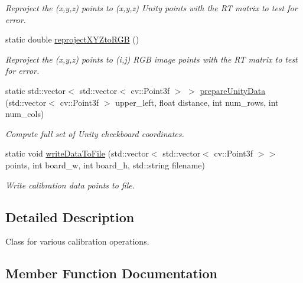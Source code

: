 \begin{DoxyCompactItemize}
\begin{DoxyCompactList}\small\item\em Reproject the (x,y,z) points to (x\textquotesingle{},y\textquotesingle{},z\textquotesingle{}) Unity points with the RT matrix to test for error. \end{DoxyCompactList}\item 
\hypertarget{class_calibration_a05a3ca33bf7fb56ddf0c683be667660a}{}\label{class_calibration_a05a3ca33bf7fb56ddf0c683be667660a} 
static double \hyperlink{class_calibration_a05a3ca33bf7fb56ddf0c683be667660a}{reproject\+X\+Y\+Zto\+R\+GB} ()
\begin{DoxyCompactList}\small\item\em Reproject the (x,y,z) points to (i,j) R\+GB image points with the RT matrix to test for error. \end{DoxyCompactList}\item 
\hypertarget{class_calibration_af202af5f65e2f7242d29f09760f668d9}{}\label{class_calibration_af202af5f65e2f7242d29f09760f668d9} 
static std\+::vector$<$ std\+::vector$<$ cv\+::\+Point3f $>$ $>$ \hyperlink{class_calibration_af202af5f65e2f7242d29f09760f668d9}{prepare\+Unity\+Data} (std\+::vector$<$ cv\+::\+Point3f $>$ upper\+\_\+left, float distance, int num\+\_\+rows, int num\+\_\+cols)
\begin{DoxyCompactList}\small\item\em Compute full set of Unity checkboard coordinates. \end{DoxyCompactList}\item 
\hypertarget{class_calibration_acd3adc799a4a9ce12ce1547e989e20a4}{}\label{class_calibration_acd3adc799a4a9ce12ce1547e989e20a4} 
static void \hyperlink{class_calibration_acd3adc799a4a9ce12ce1547e989e20a4}{write\+Data\+To\+File} (std\+::vector$<$ std\+::vector$<$ cv\+::\+Point3f $>$$>$ points, int board\+\_\+w, int board\+\_\+h, std\+::string filename)
\begin{DoxyCompactList}\small\item\em Write calibration data points to file. \end{DoxyCompactList}\end{DoxyCompactItemize}


\subsection{Detailed Description}
Class for various calibration operations. 

\subsection{Member Function Documentation}
\hypertarget{class_calibration_ac69c3f4ad6231d799e7b3d644acf1dcf}{}\label{class_calibration_ac69c3f4ad6231d799e7b3d644acf1dcf} 
